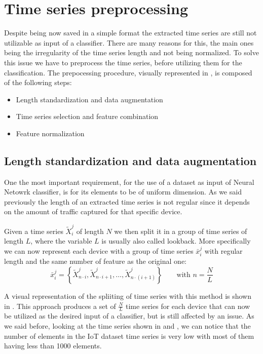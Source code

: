 \section{Time series preprocessing}

Despite being now saved in a simple format the extracted time series are still not utilizable as input of a classifier. There are many reasons for this, the main ones being the irregularity of the time series length and not being normalized. To solve this issue we have to preprocess the time series, before utilizing them for the classification. 
The prepocessing procedure, visually represented in , is composed of the following steps:
\begin{itemize}[noitemsep]
    \item {Length standardization} and data augmentation
    \item Time series selection and feature combination
    \item Feature normalization
\end{itemize}

\subsection{Length standardization and data augmentation} \label{splitting}

One the most important requirement, for the use of a dataset as input of Neural Netowrk classifier, is for its elements to be of uniform dimension. As we said previously the length of an extracted time series is not regular since it depends on the amount of traffic captured for that specific device.

Given a time series ${\tilde{X}_i^j}$ of length $N$ we then split it in a group of time series of length $L$, where the variable $L$ is usually also called lookback. More specifically we can now represent each device with a group of time series $\bar{x}_i^j$ with regular length and the same number of feature as the original one:
\begin{equation}
    \bar{x}_i^j = \left\{\tilde{X}_{n\cdot i}^j, \tilde{X}_{n\cdot i +1 }^j, \dots, \tilde{X}_{n\cdot(i+1)}^j  \right\}
    \qquad\text{with }n=\frac{N}{L}
\end{equation}

A visual representation of the spliiting of time series with this method is shown in . This approach produces a set of $\frac{N}{L}$ time series for each device that can now be utilized as the desired input of a classifier, but is still affected by an issue. As we said before, looking at the time series shown in  and , we can notice that the number of elements in the IoT dataset time series is very low with most of them having less than 1000 elements. 

